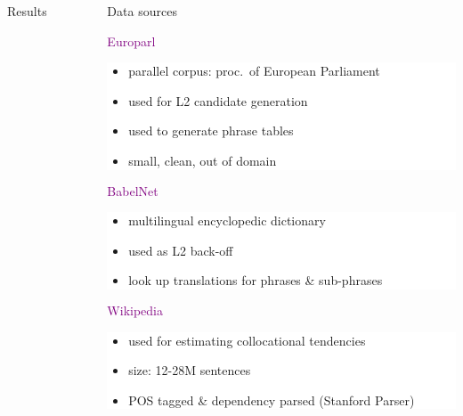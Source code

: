 \documentclass[final,t]{beamer}
\begin{document}
\begin{frame}{}
\begin{columns}[t]
\begin{column}{.5\linewidth}
\begin{block}{Results}
\begin{center}
\end{center}
\end{block}

\end{column}

\begin{column}{.47\linewidth}

\begin{block}{Data sources}

\begin{center}
\textcolor{purple}{Europarl}
\end{center}

\colorbox{white}{
\begin{minipage}{.85\linewidth}
\begin{itemize}
\item parallel corpus: proc.\ of European Parliament
\item used for L2 candidate generation
\item  used to generate phrase tables
\item small, clean, out of domain
\end{itemize}
\end{minipage}
}

\begin{center}
\textcolor{purple}{BabelNet}
\end{center}

\colorbox{white}{
\begin{minipage}{.85\linewidth}
\begin{itemize}
\item multilingual encyclopedic dictionary
\item used as L2 back-off 
\item look up translations for phrases \& sub-phrases
\end{itemize}
\end{minipage}
}

\begin{center}
\textcolor{purple}{Wikipedia}
\end{center}

\colorbox{white}{
\begin{minipage}{.85\linewidth}
\begin{itemize}
\item used for estimating collocational tendencies
\item size: 12-28M sentences
\item POS tagged \& dependency parsed (Stanford Parser)
\end{itemize}
\end{minipage}
}


\end{block}
\end{column}
\end{columns}
\end{frame}
\end{document}
